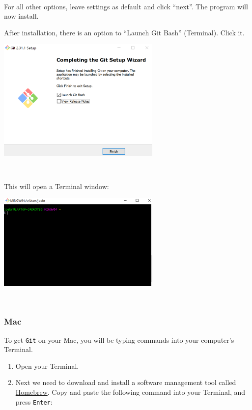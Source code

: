 \documentclass[]{book}
\begin{document}
~

For all other options, leave settings as default and click ``next''. The program will now install.

After installation, there is an option to ``Launch Git Bash'' (Terminal). Click it.

\includegraphics[width=0.6\textwidth,height=\textheight]{img/git3.png}

~

This will open a Terminal window:

\includegraphics[width=0.6\textwidth,height=\textheight]{img/git4.png}

~

\hypertarget{mac}{%
\subsubsection*{Mac}\label{mac}}

To get \texttt{Git} on your Mac, you will be typing commands into your computer's Terminal.

\begin{enumerate}
\def\labelenumi{\arabic{enumi}.}
\item
  Open your Terminal.
\item
  Next we need to download and install a software management tool called \href{brew.sh}{Homebrew}. Copy and paste the following command into your Terminal, and press \texttt{Enter}:
\end{enumerate}
\end{document}
